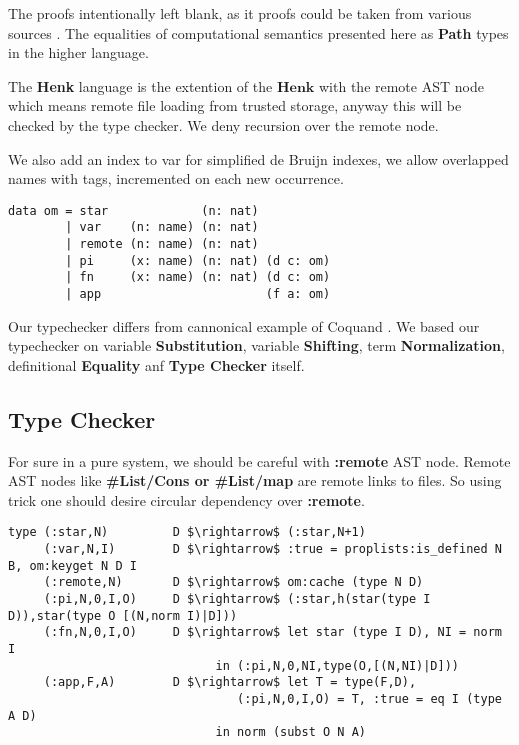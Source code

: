\documentclass{article}
\begin{document}
The proofs intentionally left blank, as it proofs could be taken from various sources \cite{Henk93}.
The equalities of computational semantics presented here as {\bf Path} types in the higher language.

The {\bf Henk} language is the extention of the $\mathbf{Henk}$ with the remote AST node which
means remote file loading from trusted storage, anyway this will be checked by the type checker.
We deny recursion over the remote node.

We also add an index to var for simplified de Bruijn indexes, we allow overlapped names
with tags, incremented on each new occurrence.

\begin{lstlisting}[mathescape=true]
data om = star             (n: nat)
        | var    (n: name) (n: nat)
        | remote (n: name) (n: nat)
        | pi     (x: name) (n: nat) (d c: om)
        | fn     (x: name) (n: nat) (d c: om)
        | app                       (f a: om)
\end{lstlisting}

Our typechecker differs from cannonical example of Coquand \cite{Coq96}. 
We based our typechecker on variable {\bf Substitution}, variable {\bf Shifting}, term {\bf Normalization}, definitional {\bf Equality} anf {\bf Type Checker} itself.

\subsection{Type Checker}
For sure in a pure system, we should be careful with {\bf :remote} AST node.
Remote AST nodes like {\bf \#List/Cons or \#List/map} are remote links to files.
So using trick one should desire circular dependency over {\bf :remote}.

\begin{lstlisting}[mathescape=true]
type (:star,N)         D $\rightarrow$ (:star,N+1)
     (:var,N,I)        D $\rightarrow$ :true = proplists:is_defined N B, om:keyget N D I
     (:remote,N)       D $\rightarrow$ om:cache (type N D)
     (:pi,N,0,I,O)     D $\rightarrow$ (:star,h(star(type I D)),star(type O [(N,norm I)|D]))
     (:fn,N,0,I,O)     D $\rightarrow$ let star (type I D), NI = norm I
                             in (:pi,N,0,NI,type(O,[(N,NI)|D]))
     (:app,F,A)        D $\rightarrow$ let T = type(F,D),
                                (:pi,N,0,I,O) = T, :true = eq I (type A D)
                             in norm (subst O N A)
\end{lstlisting}
\end{document}
